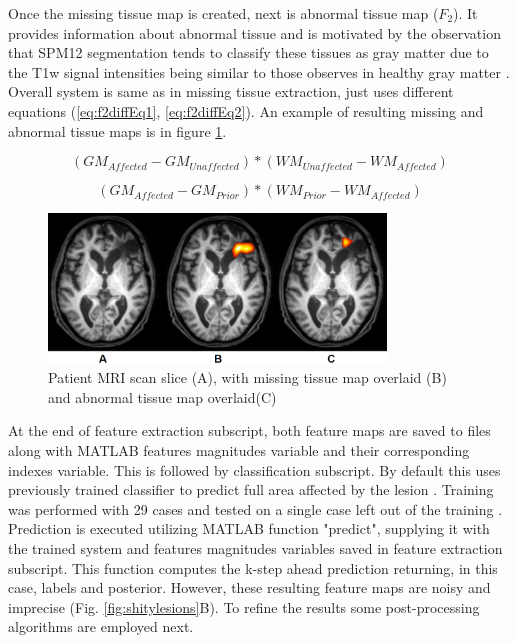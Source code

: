 \documentclass[12pt]{article}
\begin{document}
Once the missing tissue map is created, next is abnormal tissue map ($F_2$). It provides information about abnormal tissue and is motivated by the observation that SPM12 segmentation tends to classify these tissues as gray matter due to the T1w signal intensities being similar to those observes in healthy gray matter \cite{mehta2003evaluation}. Overall system is same as in missing tissue extraction, just uses different equations (\ref{eq:f2diffEq1}, \ref{eq:f2diffEq2}). An example of resulting missing and abnormal tissue maps is in figure \ref{fig:f1f2brain}.

\begin{equation}
\label{eq:f2diffEq1}
(GM_{Affected}-GM_{Unaffected})*(WM_{Unaffected}-WM_{Affected})
\end{equation}

\begin{equation}
\label{eq:f2diffEq2}
(GM_{Affected}-GM_{Prior})*(WM_{Prior}-WM_{Affected})
\end{equation}


\begin{figure}[!htb]
\centering
\includegraphics[width=0.8\textwidth]{img/f1f2brians}
\caption{Patient MRI scan slice (A), with missing tissue map overlaid (B) and abnormal tissue map overlaid(C)}
\label{fig:f1f2brain}
\end{figure}

At the end of feature extraction subscript, both feature maps are saved to files along with MATLAB features magnitudes variable and their corresponding indexes variable. This is followed by classification subscript. By default this uses previously trained classifier to predict full area affected by the lesion \cite{pereira2009machine}. Training was performed with 29 cases and tested on a single case left out of the training \cite{griffis2016voxel}. Prediction is executed utilizing MATLAB function "predict", supplying it with the trained system and features magnitudes variables saved in feature extraction subscript. This function computes the k-step ahead prediction returning, in this case, labels and posterior. However, these resulting feature maps are noisy and imprecise (Fig. \ref{fig:shitylesions}B). To refine the results some post-processing algorithms are employed next.
\end{document}
